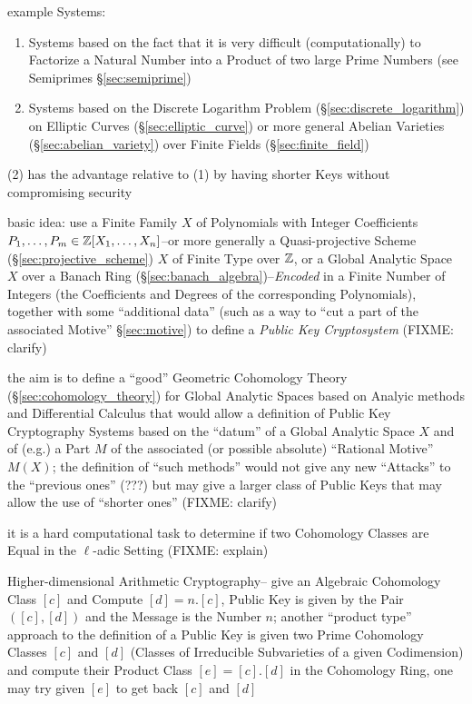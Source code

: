 example Systems:
\begin{enumerate}
  \item Systems based on the fact that it is very difficult (computationally)
    to Factorize a Natural Number into a Product of two large Prime Numbers
    (see Semiprimes \S\ref{sec:semiprime})
  \item Systems based on the Discrete Logarithm Problem
    (\S\ref{sec:discrete_logarithm}) on Elliptic Curves
    (\S\ref{sec:elliptic_curve}) or more general Abelian Varieties
    (\S\ref{sec:abelian_variety}) over Finite Fields (\S\ref{sec:finite_field})
\end{enumerate}
(2) has the advantage relative to (1) by having shorter Keys without
compromising security

basic idea: use a Finite Family $X$ of Polynomials with Integer Coefficients
$P_1, \ldots, P_m \in \mathbb{Z}[X_1, \ldots, X_n]$--or more generally a
Quasi-projective Scheme (\S\ref{sec:projective_scheme}) $X$ of Finite Type over
$\mathbb{Z}$, or a Global Analytic Space $X$ over a Banach Ring
(\S\ref{sec:banach_algebra})--\emph{Encoded} in a Finite Number of Integers
(the Coefficients and Degrees of the corresponding Polynomials), together with
some ``additional data'' (such as a way to ``cut a part of the associated
Motive'' \S\ref{sec:motive}) to define a \emph{Public Key Cryptosystem}
(FIXME: clarify)

the aim is to define a ``good'' Geometric Cohomology Theory
(\S\ref{sec:cohomology_theory}) for Global Analytic Spaces based on Analyic
methods and Differential Calculus that would allow a definition of Public Key
Cryptography Systems based on the ``datum'' of a Global Analytic Space $X$ and
of (e.g.) a Part $M$ of the associated (or possible absolute) ``Rational
Motive'' $M(X)$; the definition of ``such methods'' would not give any new
``Attacks'' to the ``previous ones'' (???) but may give a larger class of
Public Keys that may allow the use of ``shorter ones''
(FIXME: clarify)

it is a hard computational task to determine if two Cohomology Classes are
Equal in the $\ell$-adic Setting (FIXME: explain)

Higher-dimensional Arithmetic Cryptography-- give an Algebraic Cohomology Class
$[c]$ and Compute $[d] = n.[c]$, Public Key is given by the Pair $([c],[d])$
and the Message is the Number $n$; another ``product type'' approach to the
definition of a Public Key is given two Prime Cohomology Classes $[c]$ and
$[d]$ (Classes of Irreducible Subvarieties of a given Codimension) and compute
their Product Class $[e] = [c].[d]$ in the Cohomology Ring, one may try given
$[e]$ to get back $[c]$ and $[d]$



